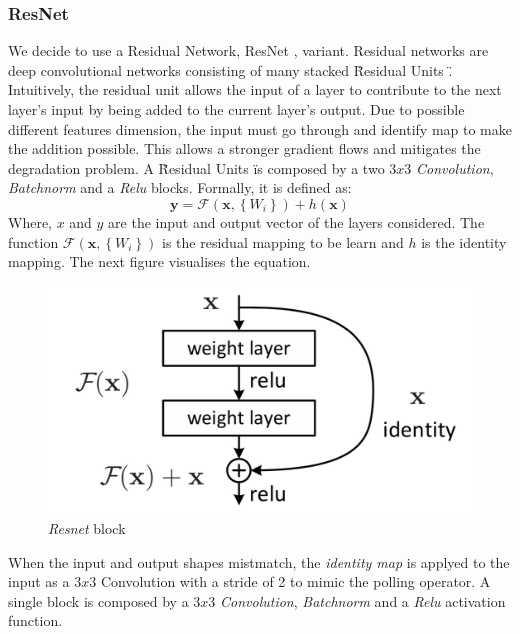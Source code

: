 \documentclass[../document.tex]{subfiles}
\begin{document}
\subsubsection{ResNet}
We decide to use a Residual Network, ResNet \cite{he2015deep}, variant. Residual networks are deep convolutional
networks consisting of many stacked \" Residual Units \". Intuitively, the residual unit allows the input of a layer to contribute to the next layer's input by being added to the current layer's output. Due to possible different features dimension, the input must go through and identify map to make the addition possible. This allows a stronger gradient flows and mitigates the degradation problem. A \"Residual Units \" is composed by a two $3x3$ \emph{Convolution}, \emph{Batchnorm} \cite{ioffe2015batch} and a \emph{Relu} blocks. Formally, it is defined as: 
\begin{equation}
    \mathbf{y}=\mathcal{F}\left(\mathbf{x},\left\{W_{i}\right\}\right)+h(\mathbf{x})
    \label{eq : resnet}
\end{equation}
Where, $x$ and $y$ are the input and output vector of the layers considered. The function $\mathcal{F}\left(\mathbf{x},\left\{W_{i}\right\}\right)$ is the residual mapping to be learn and $h$ is the identity mapping. The next figure visualises the equation.
\begin{figure}[H]
    \centering
    \includegraphics[scale=0.3]{../img/implementation/estimator/resnet_block.png}
    \caption{\emph{Resnet} block \cite{he2015deep}}
\end{figure}
When the input and output shapes mistmatch, the \emph{identity map} is applyed to the input as a $3x3$ Convolution with a stride of 2 to mimic the polling operator. A single block is composed by a $3x3$ \emph{Convolution}, \emph{Batchnorm} and a \emph{Relu} activation function. 
\end{document}
